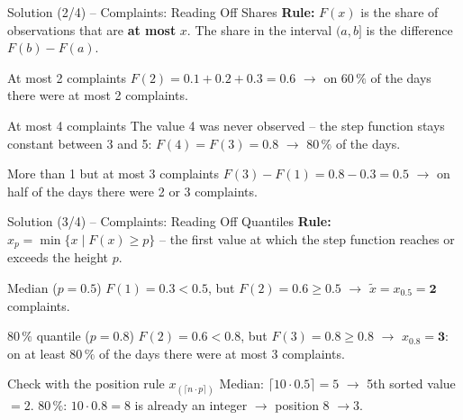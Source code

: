 \documentclass[aspectratio=169,11pt]{beamer}
\begin{document}
\begin{frame}{Solution (2/4) -- Complaints: Reading Off Shares}
  \textbf{Rule:} $F(x)$ is the share of observations that are \textbf{at most}
  $x$. The share in the interval $(a, b]$ is the difference $F(b) - F(a)$.
  \vspace{0.2cm}
  \begin{exampleblock}{At most 2 complaints}
    $F(2) = 0.1 + 0.2 + 0.3 = \mathbf{0.6}$ $\rightarrow$ on $60\,\%$ of the days
    there were at most 2 complaints.
  \end{exampleblock}
  \begin{exampleblock}{At most 4 complaints}
    The value 4 was never observed -- the step function stays constant between
    3 and 5: $F(4) = F(3) = \mathbf{0.8}$ $\rightarrow$ $80\,\%$ of the days.
  \end{exampleblock}
  \begin{exampleblock}{More than 1 but at most 3 complaints}
    $F(3) - F(1) = 0.8 - 0.3 = \mathbf{0.5}$ $\rightarrow$ on half of the days
    there were 2 or 3 complaints.
  \end{exampleblock}
\end{frame}

\begin{frame}{Solution (3/4) -- Complaints: Reading Off Quantiles}
  \textbf{Rule:} $x_{p} = \min\{x \mid F(x) \ge p\}$ -- the first value
  at which the step function reaches or exceeds the height $p$.
  \vspace{0.2cm}
  \begin{exampleblock}{Median ($p = 0.5$)}
    $F(1) = 0.3 < 0.5$, but $F(2) = 0.6 \ge 0.5$ $\rightarrow$
    $\tilde{x} = x_{0.5} = \mathbf{2}$ complaints.
  \end{exampleblock}
  \begin{exampleblock}{$80\,\%$ quantile ($p = 0.8$)}
    $F(2) = 0.6 < 0.8$, but $F(3) = 0.8 \ge 0.8$ $\rightarrow$
    $x_{0.8} = \mathbf{3}$: on at least $80\,\%$ of the days there were at most
    3 complaints.
  \end{exampleblock}
  \begin{block}{Check with the position rule $x_{(\lceil n \cdot p \rceil)}$}
    Median: $\lceil 10 \cdot 0.5 \rceil = 5$ $\rightarrow$ 5th sorted value $= 2$.
    \quad
    $80\,\%$: $10 \cdot 0.8 = 8$ is already an integer $\rightarrow$
    position $8$ $\rightarrow 3$.
  \end{block}
\end{frame}
\end{document}
